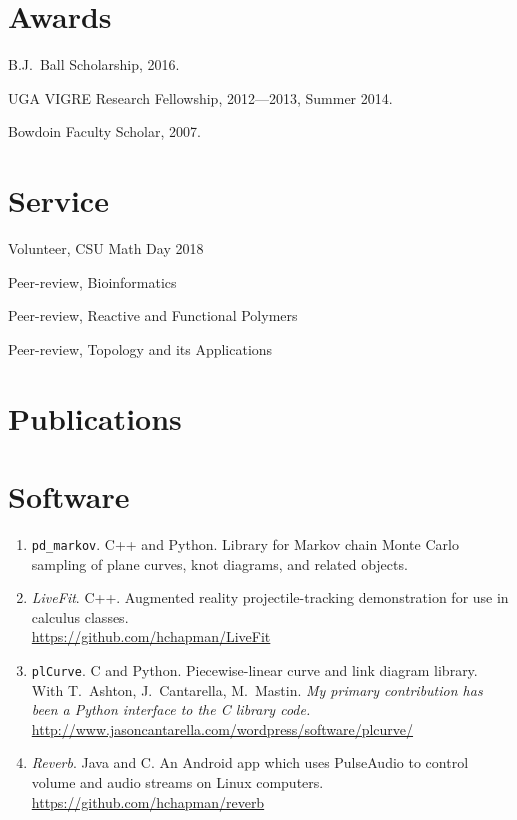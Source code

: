 \documentclass[letterpaper]{article}
\renewenvironment{itemize}{
  \begin{list}{}{
    \setlength{\leftmargin}{1.5em}
  }
}{
  \end{list}
}
\begin{document}
 \section*{Awards}

 \begin{itemize}
 \item B.J.\ Ball Scholarship, 2016.
 \item UGA VIGRE Research Fellowship, 2012---2013, Summer 2014.
 \item Bowdoin Faculty Scholar, 2007.
 \end{itemize}

 \section*{Service}
 \begin{itemize}
 \item Volunteer, CSU Math Day 2018
 \item Peer-review, Bioinformatics
 \item Peer-review, Reactive and Functional Polymers
 \item Peer-review, Topology and its Applications
 \end{itemize}
\section*{Publications}

\nocite{*}
\printbibliography[heading=none]

\section*{Software}

\begin{enumerate}
\item \texttt{pd\_markov}. C++ and Python. Library for Markov chain Monte Carlo sampling of plane curves, knot diagrams, and related objects.
\item \emph{LiveFit}. C++. Augmented reality projectile-tracking demonstration
  for use in calculus classes. \\
  \url{https://github.com/hchapman/LiveFit}
\item \texttt{plCurve}. C and Python. Piecewise-linear curve and link diagram library.\\
  With T.\ Ashton, J.\ Cantarella, M.\ Mastin.
  \textit{My primary contribution has been a Python interface to the C
    library code.} \\
  \url{http://www.jasoncantarella.com/wordpress/software/plcurve/}
\item \emph{Reverb}. Java and C. An Android app which uses PulseAudio to
  control volume and audio streams on Linux computers. \\
  \url{https://github.com/hchapman/reverb}
\end{enumerate}
\end{document}
